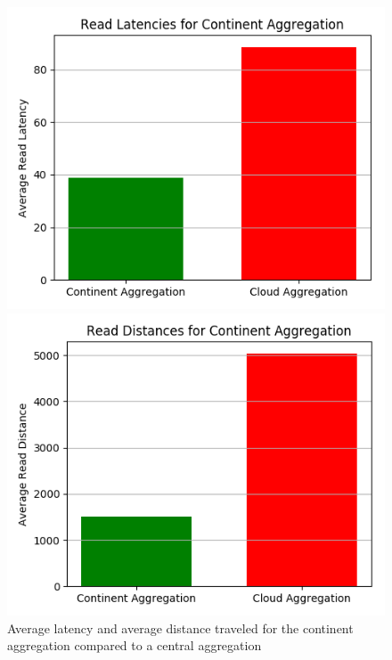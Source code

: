 \begin{figure}[H]
\begin{minipage}{0.49\textwidth}
\centering
\includegraphics[width=1\linewidth]{Figures/Evaluation/read-by-latency-Continent-Aggregation.png}
\end{minipage}
\hfill
\begin{minipage}{0.49\textwidth}
\centering
\includegraphics[width=1\linewidth]{Figures/Evaluation/read-by-distance-Continent-Aggregation.png}
\end{minipage}
\label{fig:read-by-continent}
\caption{Average latency and average distance traveled for the continent aggregation compared to a central aggregation}
\end{figure}

